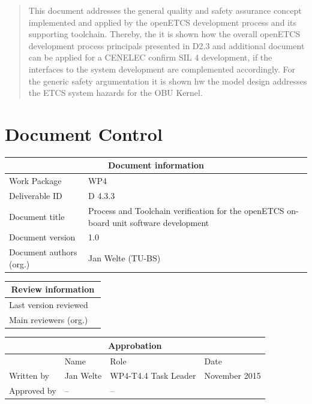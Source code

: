 \documentclass{template/openetcs_report}
\begin{document}
\begin{abstract}
This document addresses the general quality and safety assurance concept implemented and applied by the openETCS development process and its supporting toolchain. Thereby, the it is shown how the overall openETCS development process principals presented in D2.3 and  additional document can be applied for a CENELEC confirm SIL 4 development, if the interfaces to the system development are complemented accordingly. For the generic safety argumentation it is shown hw the model design addresses the ETCS system hazards for the OBU Kernel.

\end{abstract}

\maketitle
\tableofcontents
\listoffiguresandtables
\newpage

\chapter{Document Control}

\begin{tabular}{|p{4.4cm}|p{8.7cm}|}
\hline
\multicolumn{2}{|c|}{Document information} \\
\hline
Work Package &  WP4  \\
Deliverable ID & D 4.3.3\\
\hline
Document title & Process and Toolchain verification for the openETCS on-board unit software development \\
Document version & 1.0 \\
Document authors (org.)  & Jan Welte (TU-BS)\\
\hline
\end{tabular}

\begin{tabular}{|p{4.4cm}|p{8.7cm}|}
\hline
\multicolumn{2}{|c|}{Review information} \\
\hline
Last version reviewed & \\
\hline
Main reviewers (org.) & \\
\hline
\end{tabular}

\begin{tabular}{|p{2.2cm}|p{4cm}|p{4cm}|p{2cm}|}
\hline
\multicolumn{4}{|c|}{Approbation} \\
\hline
  &  Name & Role & Date   \\
\hline  
Written by    &  Jan Welte & WP4-T4.4 Task Leader  &  November 2015\\
\hline
Approved by & -- & -- & \\
\hline
\end{tabular}
\end{document}

